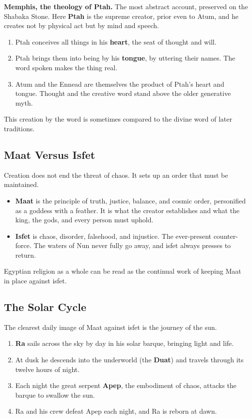 \textbf{Memphis, the theology of Ptah.} The most abstract account, preserved on the Shabaka Stone. Here \textbf{Ptah} is the supreme creator, prior even to Atum, and he creates not by physical act but by mind and speech.

\begin{enumerate}
 \item Ptah conceives all things in his \textbf{heart}, the seat of thought and will.
 \item Ptah brings them into being by his \textbf{tongue}, by uttering their names. The word spoken makes the thing real.
 \item Atum and the Ennead are themselves the product of Ptah's heart and tongue. Thought and the creative word stand above the older generative myth.
\end{enumerate}

This creation by the word is sometimes compared to the divine word of later traditions.

\subsection{Maat Versus Isfet}

Creation does not end the threat of chaos. It sets up an order that must be maintained.

\begin{itemize}
 \item \textbf{Maat} is the principle of truth, justice, balance, and cosmic order, personified as a goddess with a feather. It is what the creator establishes and what the king, the gods, and every person must uphold.
 \item \textbf{Isfet} is chaos, disorder, falsehood, and injustice. The ever-present counter-force. The waters of Nun never fully go away, and isfet always presses to return.
\end{itemize}

Egyptian religion as a whole can be read as the continual work of keeping Maat in place against isfet.

\subsection{The Solar Cycle}

The clearest daily image of Maat against isfet is the journey of the sun.

\begin{enumerate}
 \item \textbf{Ra} sails across the sky by day in his solar barque, bringing light and life.
 \item At dusk he descends into the underworld (the \textbf{Duat}) and travels through its twelve hours of night.
 \item Each night the great serpent \textbf{Apep}, the embodiment of chaos, attacks the barque to swallow the sun.
 \item Ra and his crew defeat Apep each night, and Ra is reborn at dawn.
\end{enumerate}

